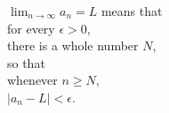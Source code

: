 \documentclass[border=6pt]{standalone}
\begin{document}
\parbox{1.8in}{$\displaystyle\lim_{n \to \infty} a_n = L$ means that \\
\null\quad for every $\epsilon > 0$, \\
\null\quad there is a whole number $N$, \\
so that \\
\null\quad whenever $n \geq N$, \\
\null\quad $|a_n - L| < \epsilon$.
}
\end{document}
